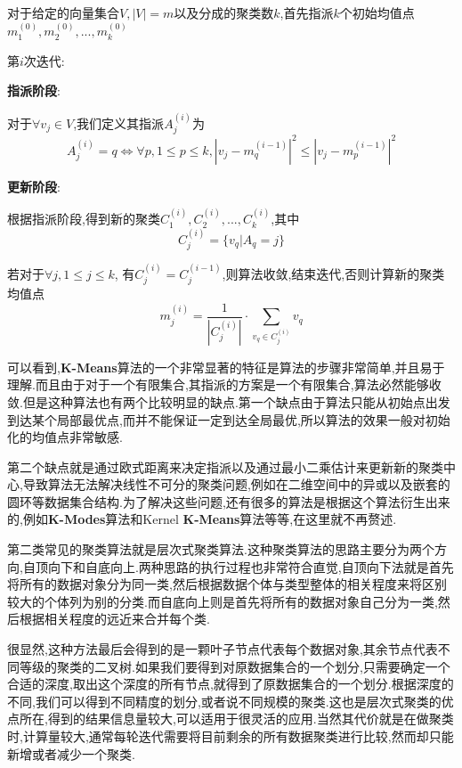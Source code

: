 \begin{algo}[K-means算法]
	对于给定的向量集合$V, |V|=m$以及分成的聚类数$k$,首先指派$k$个初始均值点$m^{(0)}_1,m^{(0)}_2,...,m^{(0)}_k$
	
	第$i$次迭代:
	
	\textbf{指派阶段}:
	
	对于$\forall v_j \in V$,我们定义其指派$A^{(i)}_j$为
	\begin{equation}
		A_j^{(i)} = q \iff \forall p, 1 \leq p \leq k, |v_j - m_q^{(i-1)}|^2 \leq |v_j - m_p^{(i-1)}|^2
	\end{equation}
	
	\textbf{更新阶段}:
	
	根据指派阶段,得到新的聚类$C^{(i)}_1,C^{(i)}_2,...,C^{(i)}_k$,其中
	\begin{equation}
		C^{(i)}_j = \{v_q|A_q=j\}
	\end{equation}
	
	若对于$\forall j, 1 \leq j \leq k$, 有$C^{(i)}_j = C^{(i-1)}_j$,则算法收敛,结束迭代,否则计算新的聚类均值点
	\begin{equation}
		m^{(i)}_j = \dfrac{1}{|C^{(i)}_j|} \cdot \sum_{v_q \in C^{(i)}_j} v_q
	\end{equation}
	
\end{algo}

可以看到,\textbf{K-Means}算法的一个非常显著的特征是算法的步骤非常简单,并且易于理解.而且由于对于一个有限集合,其指派的方案是一个有限集合,算法必然能够收敛.但是这种算法也有两个比较明显的缺点.第一个缺点由于算法只能从初始点出发到达某个局部最优点,而并不能保证一定到达全局最优,所以算法的效果一般对初始化的均值点非常敏感.

第二个缺点就是通过欧式距离来决定指派以及通过最小二乘估计来更新新的聚类中心,导致算法无法解决线性不可分的聚类问题,例如在二维空间中的异或以及嵌套的圆环等数据集合结构.为了解决这些问题,还有很多的算法是根据这个算法衍生出来的,例如\textbf{K-Modes}算法和Kernel \textbf{K-Means}算法等等,在这里就不再赘述.

第二类常见的聚类算法就是层次式聚类算法.这种聚类算法的思路主要分为两个方向,自顶向下和自底向上.两种思路的执行过程也非常符合直觉,自顶向下法就是首先将所有的数据对象分为同一类,然后根据数据个体与类型整体的相关程度来将区别较大的个体列为别的分类.而自底向上则是首先将所有的数据对象自己分为一类,然后根据相关程度的远近来合并每个类.

很显然,这种方法最后会得到的是一颗叶子节点代表每个数据对象,其余节点代表不同等级的聚类的二叉树.如果我们要得到对原数据集合的一个划分,只需要确定一个合适的深度,取出这个深度的所有节点,就得到了原数据集合的一个划分.根据深度的不同,我们可以得到不同精度的划分,或者说不同规模的聚类.这也是层次式聚类的优点所在,得到的结果信息量较大,可以适用于很灵活的应用.当然其代价就是在做聚类时,计算量较大,通常每轮迭代需要将目前剩余的所有数据聚类进行比较,然而却只能新增或者减少一个聚类.

